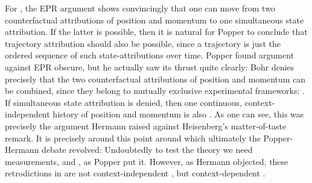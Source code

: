 \documentclass[final,12pt]{article}
\begin{document}
For , the EPR argument shows convincingly that one can move from two counterfactual attributions of position and momentum to one simultaneous state attribution. If the latter is possible, then it is natural for Popper to conclude that trajectory attribution should also be possible, since a trajectory is just the ordered sequence of such state-attributions over time. Popper found  argument against EPR obscure, but he actually saw its thrust quite clearly: Bohr denies precisely that the two counterfactual attributions of position and momentum can be combined, since they belong to mutually exclusive experimental frameworks:  \citep[149]{Popper1982}. If simultaneous state attribution is denied, then one continuous, context-independent history of position and momentum is also . As one can see, this was precisely the argument Hermann raised against Heisenberg's matter-of-taste remark. It is precisely around this point around which ultimately the Popper-Hermann debate revolved: Undoubtedly to test the theory we need measurements, and , as Popper put it. However, as Hermann objected, these retrodictions in \qm are not context-independent , but context-dependent .




\citetrackerfalse

\printshorthands
\printbibliography
\end{document}
